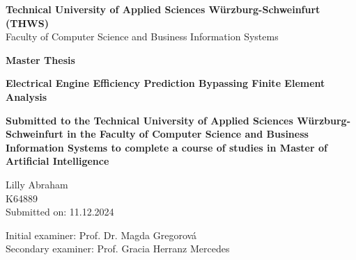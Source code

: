 \documentclass{report} %
\begin{document}
\begin{titlepage}
    \centering
    \vspace*{1cm}
    
    \Large \textbf{Technical University of Applied Sciences Würzburg-Schweinfurt (THWS)}\\
    \vspace{0.5cm}
    \Large Faculty of Computer Science and Business Information Systems\\
    \vspace{1cm}
    
    \huge \textbf{Master Thesis}\\
    \vspace{1.5cm}
    
    \Huge \textbf{Electrical Engine Efficiency Prediction Bypassing Finite Element Analysis}\\
    \vspace{2cm}
    
    \large \textbf{Submitted to the Technical University of Applied Sciences Würzburg-Schweinfurt in the Faculty of Computer Science and Business Information Systems to
    complete a course of studies in Master of Artificial Intelligence}
    
    \vspace{1cm}
    
    \huge Lilly Abraham\\
    \huge K64889\\
    \vspace{1cm}
    \large Submitted on: 11.12.2024\\
    
    \vfill
    
    \large
    Initial examiner: Prof. Dr. Magda Gregorová\\
    Secondary examiner: Prof. Gracia Herranz Mercedes\\

\end{titlepage}

\newpage %
\end{document}
